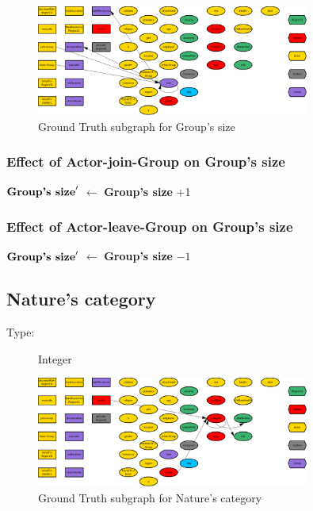 \documentclass{article}%
\begin{document}
\begin{figure}[ht]%
\centering%
\includegraphics[width=0.8\textwidth]{images/sizeOfGroup.png}%
\caption{Ground Truth subgraph for Group's size}%
\end{figure}

%
\subsubsection{Effect of Actor{-}join{-}Group on Group's size}%
\label{ssubsec:Effect of Actor{-}join{-}Group on Group's size}%
\begin{flushleft}%
$\mbox{\textbf{Group's size}} '$%
$\leftarrow$%
\textbf{Group's size}%
+1%
\end{flushleft}

%
\subsubsection{Effect of Actor{-}leave{-}Group on Group's size}%
\label{ssubsec:Effect of Actor{-}leave{-}Group on Group's size}%
\begin{flushleft}%
$\mbox{\textbf{Group's size}} '$%
$\leftarrow$%
\textbf{Group's size}%
${-}1$%
\end{flushleft}

%
\subsection{Nature's category}%
\label{subsec:Nature's category}%
\begin{description}%
\item[Type:]%
Integer%
\end{description}%


\begin{figure}[ht]%
\centering%
\includegraphics[width=0.8\textwidth]{images/categoryOfNature.png}%
\caption{Ground Truth subgraph for Nature's category}%
\end{figure}
\end{document}
